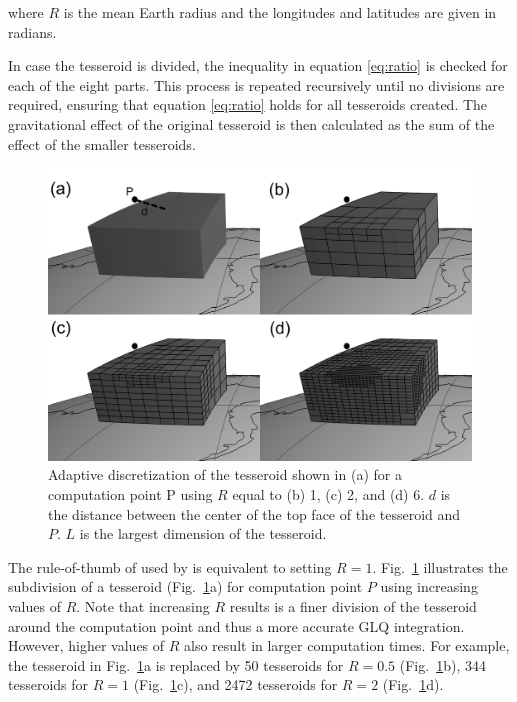 \documentclass[extra]{gji}
\begin{document}
\noindent
where $R$ is the mean Earth radius
and the longitudes and latitudes are given in radians.

In case the tesseroid is divided,
the inequality in equation \ref{eq:ratio}
is checked for each of the eight parts.
This process is repeated recursively
until no divisions are required,
ensuring that equation \ref{eq:ratio}
holds for all tesseroids created.
The gravitational effect
of the original tesseroid
is then calculated as
the sum of the effect
of the smaller tesseroids.

\begin{figure}
    \centering
    \includegraphics[width=\columnwidth]{figs/tesseroid-split}
    \caption{
        Adaptive discretization
        of the tesseroid shown in (a)
        for a computation point P
        using $R$ equal to
        (b) 1, (c) 2, and (d) 6.
        $d$ is the distance between
        the center of the top face of the tesseroid
        and $P$.
        $L$ is the largest dimension of the tesseroid.
    }
    \label{fig:ratio}
\end{figure}

The rule-of-thumb of \citet{Ku1977}
used by \citet{Li2011}
is equivalent to setting $R=1$.
Fig.~\ref{fig:ratio}
illustrates the subdivision of a tesseroid
(Fig.~\ref{fig:ratio}a)
for computation point $P$
using increasing values of $R$.
Note that increasing $R$
results is a finer division of the tesseroid
around the computation point
and thus a more accurate GLQ integration.
However, higher values of $R$
also result in
larger computation times.
For example,
the tesseroid in Fig.~\ref{fig:ratio}a
is replaced by
50 tesseroids for $R=0.5$ (Fig.~\ref{fig:ratio}b),
344 tesseroids for $R=1$ (Fig.~\ref{fig:ratio}c),
and 2472 tesseroids for  $R=2$ (Fig.~\ref{fig:ratio}d).
\end{document}
